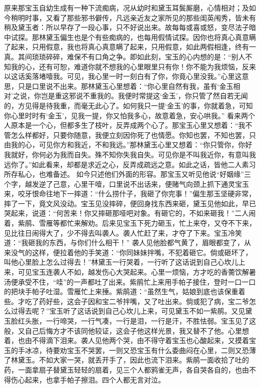 \documentclass[12pt,oneside]{book}
\begin{document}
原来那宝玉自幼生成有一种下流痴病，况从幼时和黛玉耳鬓厮磨，心情相对；及如今稍明时事，又看了那些邪书僻传，凡远亲近友之家所见的那些闺英闱秀，皆未有稍及黛玉者：所以早存了一段心事，只不好说出来。故每每或喜或怒，变尽法子暗中试探。那林黛玉偏生也是个有些痴病的，也每用假情试探。因你也将真心真意瞒了起来，只用假意，我也将真心真意瞒了起来，只用假意，如此两假相逢，终有一真。其间琐琐碎碎，难保不有口角之争。即如此刻，宝玉的心内想的是：“别人不知我的心，还有可恕，难道你就不想我的心里眼里只有你！你不能为我烦恼，反来以这话奚落堵噎我。可见，我心里一时一刻白有了你，你竟心里没我。”心里这意思，只是口里说不出来。那林黛玉心里想着：“你心里自然有我，虽有‘金玉相对’之说，你岂是重这邪说不重我的。我便时常提这‘金玉’，你只管了然自若无闻的，方见得是待我重，而毫无此心了。如何我只一提‘金玉’的事，你就着急，可知你心里时时有‘金玉’，见我一提，你又怕我多心，故意着急，安心哄我。”
看来两个人原本是一个心，但都多生了枝叶，反弄成两个心了。那宝玉心里又想着：“我不管怎么样都好，只要你随意，我便立刻因你死了也情愿。你知也罢，不知也罢，只由我的心，可见你方和我近，不和我远。”那林黛玉心里又想着：“你只管你，你好我就好，你何必为我而自失。殊不知你失我自失。可见你是不叫我近你，有意叫我远你了。”如此看来，却都是求近之心，反弄成疏远之意。如此之话，皆他二人素习所存私心，也难备述。
如今只述他们外面的形容。那宝玉又听见他说“好姻缘”三个字，越发逆了己意，心里干噎，口里说不出话来，便赌气向颈上抓下通灵宝玉来，咬牙恨命往地下一摔道：“什么捞什子，我砸了你完事！”偏生那玉坚硬非常，摔了一下，竟文风没动。宝玉见没摔碎，便回身找东西来砸，黛玉见他如此，早已哭起来，说道：“何苦来！你又摔砸那哑吧对象。有砸它的，不如来砸我！”二人闹着，紫鹃、雪雁等都忙来解劝。后来见宝玉下死力砸玉，忙上来夺，又夺不下来，见比往日闹得大了，少不得去叫袭人。袭人忙赶了来，才夺了下来。宝玉冷笑道：“我砸我的东西，与你们什么相干！”
袭人见他脸都气黄了，眉眼都变了，从来没气的这样，便拉着他的手笑道：“你同妹妹拌嘴，不犯着砸它。倘或砸坏了，叫他心里脸上怎么过得去！”林黛玉一行哭着，一行听了这话说到自己心坎儿上来，可见宝玉连袭人不如，越发伤心大哭起来。心里一烦恼，方才吃的香薷饮解暑汤便承受不住，“哇”的一声都吐了出来。紫鹃忙上来用手帕子接住，登时一口一口的把块手帕子吐湿。雪雁忙上来捶。紫鹃道：“虽然生气，姑娘到底也该保重着些。才吃了药好些，这会子因和宝二爷拌嘴，又了吐出来。倘或犯了病，宝二爷怎么过得去呢？”宝玉听了这话说到自己心坎儿上来，可见黛玉不如一紫鹃。又见黛玉脸红头胀，一行啼哭，一行气凑，一行是泪，一行是汗，不胜怯弱。宝玉见了这般，又自己后悔方才不该同他较证，这会子他这样光景，我又替不了他。心里想着，也由不得滴下泪来。袭人见他两个哭，由不得守着宝玉也心酸起来，又摸着宝玉的手冰凉，待要劝宝玉不哭罢，一则又恐宝玉有什么委曲闷在心里，二则又恐薄了林黛玉。不如大家一哭，就丢开手了，因此也流下泪来。紫鹃一面收拾了吐的药，一面拿扇子替黛玉轻轻的扇着，见三个人都鸦雀无声，各自哭各自的，也由不得伤心起来，也拿手帕子擦泪。四个人都无言对泣。
\end{document}
